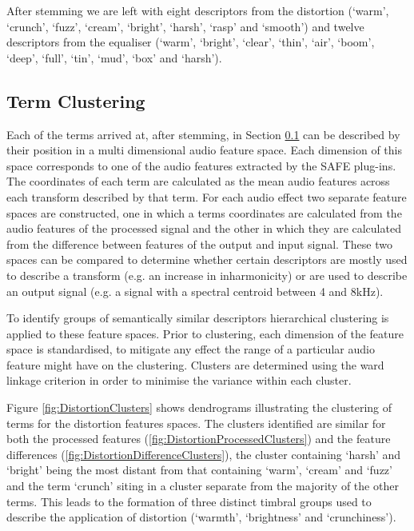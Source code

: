 		After stemming we are left with eight descriptors from the distortion (`warm', `crunch', `fuzz', `cream',
		`bright', `harsh', `rasp' and `smooth') and twelve descriptors from the equaliser (`warm', `bright',
		`clear', `thin', `air', `boom', `deep', `full', `tin', `mud', `box' and `harsh').

	\subsection{Term Clustering}
	\label{sec:TimbreEvaluation-Analysis-TermClustering}
		Each of the terms arrived at, after stemming, in Section \ref{sec:TimbreEvaluation-Analysis-TermClustering}
		can be described by their position in a multi dimensional audio feature space. Each dimension of this space
		corresponds to one of the audio features extracted by the SAFE plug-ins. The coordinates of each term are
		calculated as the mean audio features across each transform described by that term. For each audio effect
		two separate feature spaces are constructed, one in which a terms coordinates are calculated from the audio
		features of the processed signal and the other in which they are calculated from the difference between
		features of the output and input signal. These two spaces can be compared to determine whether certain
		descriptors are mostly used to describe a transform (e.g. an increase in inharmonicity) or are used to
		describe an output signal (e.g. a signal with a spectral centroid between 4 and 8kHz).

		To identify groups of semantically similar descriptors hierarchical clustering is applied to these feature
		spaces. Prior to clustering, each dimension of the feature space is standardised, to mitigate any effect the
		range of a particular audio feature might have on the clustering. Clusters are determined using the ward
		linkage criterion in order to minimise the variance within each cluster.

		Figure \ref{fig:DistortionClusters} shows dendrograms illustrating the clustering of terms for the
		distortion features spaces. The clusters identified are similar for both the processed features
		(\ref{fig:DistortionProcessedClusters}) and the feature differences
		(\ref{fig:DistortionDifferenceClusters}), the cluster containing `harsh' and `bright' being the most distant
		from that containing `warm', `cream' and `fuzz' and the term `crunch' siting in a cluster separate from the
		majority of the other terms. This leads to the formation of three distinct timbral groups used to describe
		the application of distortion (`warmth', `brightness' and `crunchiness'). 

